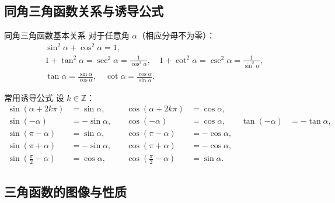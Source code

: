 \documentclass[a4paper,11pt]{ctexart}
\begin{document}
\subsection{同角三角函数关系与诱导公式}

\begin{theorembox}{同角三角函数基本关系}
对于任意角 $\alpha$（相应分母不为零）：
\begin{align*}
&\sin^2\alpha + \cos^2\alpha = 1,\\
&1 + \tan^2\alpha = \sec^2\alpha = \frac{1}{\cos^2\alpha},\quad
1 + \cot^2\alpha = \csc^2\alpha = \frac{1}{\sin^2\alpha},\\
&\tan\alpha = \frac{\sin\alpha}{\cos\alpha},\quad
\cot\alpha = \frac{\cos\alpha}{\sin\alpha}.
\end{align*}
\end{theorembox}

\begin{theorembox}{常用诱导公式}
设 $k\in\mathbb{Z}$：
\begin{align*}
\sin(\alpha + 2k\pi) &= \sin\alpha,\quad &\cos(\alpha + 2k\pi) &= \cos\alpha,\\
\sin(-\alpha) &= -\sin\alpha,\quad &\cos(-\alpha) &= \cos\alpha,\quad &\tan(-\alpha) &= -\tan\alpha,\\
\sin(\pi - \alpha) &= \sin\alpha,\quad &\cos(\pi - \alpha) &= -\cos\alpha,\\
\sin(\pi + \alpha) &= -\sin\alpha,\quad &\cos(\pi + \alpha) &= -\cos\alpha,\\
\sin\left(\frac{\pi}{2} - \alpha\right) &= \cos\alpha,\quad
&\cos\left(\frac{\pi}{2} - \alpha\right) &= \sin\alpha.
\end{align*}
\end{theorembox}

\subsection{三角函数的图像与性质}
\end{document}
